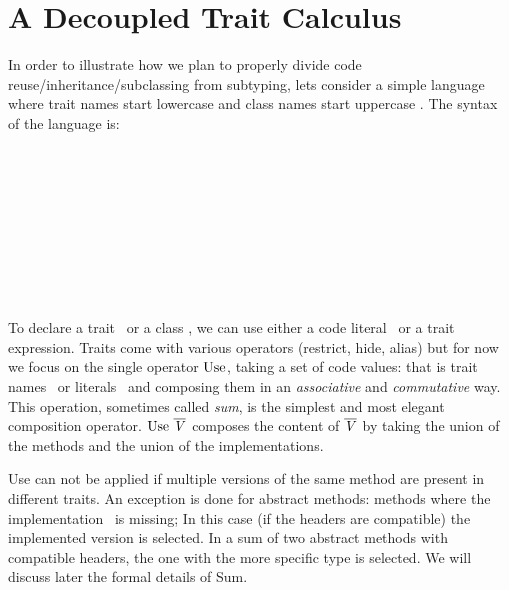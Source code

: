 \section{A Decoupled Trait Calculus}
In order to illustrate how we plan to properly divide code reuse/inheritance/subclassing from subtyping,
lets consider a simple language where trait names start lowercase \mt
and class names start uppercase \mC.  
The syntax of the language is:

\begin{bnf}
\prodFull{}\\
\prodFull{}\\
\prodFull{}\\
\prodFull{}\\
\prodFull{}\\
\prodFull{}\\

\prodFull{}\\
\prodFull{}\\
\end{bnf}

To declare a trait \mTD\ or a class \mCD, we can use either a code literal \mL\ or a trait
expression.  Traits come with various operators (restrict, hide,
alias) but for now we focus on the single operator 
$\use$, taking a set
of code values: that is trait names \mt\ or literals \mL\ and composing them in an \emph{associative}
and \emph{commutative} way.  This operation, sometimes called \emph{sum}, is the simplest and most elegant
composition operator.  $\use\ \overline\mV$ composes the content of $\overline{\mathit{V}}$
by taking the union of the methods and the union of the implementations.

Use can not be applied if multiple versions of the same method are
present in different traits.  An exception is done for abstract methods:
methods where the implementation \me\ is missing; In this case (if the
headers are compatible) the implemented version is selected.  In a sum
of two abstract methods with compatible headers, the one with the more
specific type is selected. We will discuss later the formal details of
Sum.

